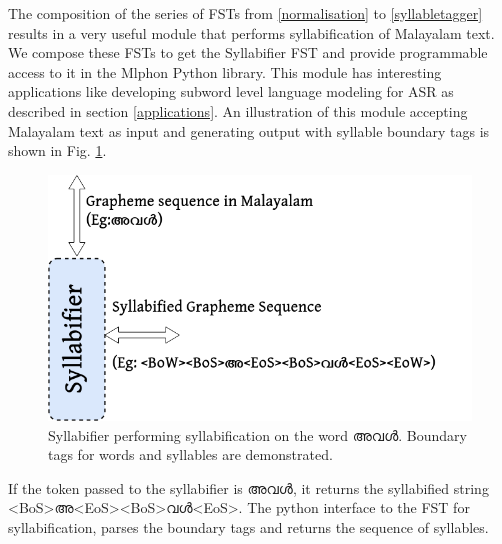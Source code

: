 \documentclass{ieeeaccess}
\begin{document}
The composition of the series of FSTs from \ref{normalisation} to \ref{syllabletagger} results in a very useful module that performs syllabification of Malayalam text. We compose these FSTs to get the Syllabifier FST and provide programmable access to it in the Mlphon Python library. This module has interesting applications like developing subword level language modeling for ASR as described in section \ref{applications}. An illustration of this module accepting Malayalam text as input and generating output with syllable boundary tags is shown in Fig. \ref{syllabifierblock}.


\begin{figure}[h]
	\centering
	\includegraphics[width=0.8\linewidth]{syllabifier.png}
	\caption{Syllabifier performing syllabification on the word {\mal അവൾ}. Boundary tags for words and syllables are demonstrated.}
	\label{syllabifierblock}
\end{figure}



If the token passed to the syllabifier is {\mal അവൾ}, it returns the syllabified string  {\ipa <BoS>}{\mal അ}{\ipa <EoS><BoS>}{\mal വൾ}{\ipa <EoS>}.  The python interface to the FST for syllabification, parses the boundary tags and returns the sequence of syllables.
\end{document}

